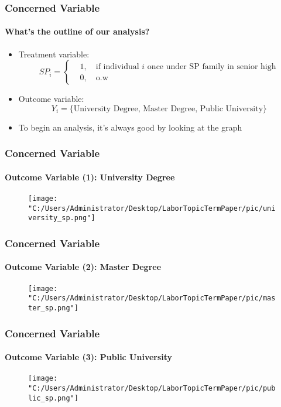 \documentclass{beamer}
\begin{document}
\begin{frame} %
\frametitle{Concerned Variable}
\framesubtitle{What's the outline of our analysis?}

    \begin{itemize}
        \item Treatment variable:
        \[
            \textit{SP}_i =
            \left\{\begin{aligned}
            &1,\quad\text{if individual $i$ once under SP family in senior high} \\
            &0,\quad\text{o.w}
            \end{aligned}\right.
        \]
        \item Outcome variable: 
        \[
            Y_i = \{\text{University Degree, Master Degree, Public University}\}  
        \]
        \item To begin an analysis, it's always good by looking at the graph 
    \end{itemize}

\end{frame}


\begin{frame} %
\frametitle{Concerned Variable}
\framesubtitle{Outcome Variable (1): University Degree}

    \begin{figure}
        \centering
        \texttt{[image: "C:/Users/Administrator/Desktop/LaborTopicTermPaper/pic/university\_sp.png"]}
    \end{figure}

\end{frame}


\begin{frame} %
\frametitle{Concerned Variable}
\framesubtitle{Outcome Variable (2): Master Degree}

    \begin{figure}
        \centering
        \texttt{[image: "C:/Users/Administrator/Desktop/LaborTopicTermPaper/pic/master\_sp.png"]}
    \end{figure}

\end{frame}


\begin{frame} %
\frametitle{Concerned Variable}
\framesubtitle{Outcome Variable (3): Public University}

    \begin{figure}
        \centering
        \label{Fig.sub.1}
        \texttt{[image: "C:/Users/Administrator/Desktop/LaborTopicTermPaper/pic/public\_sp.png"]}
    \end{figure}

\end{frame}
\end{document}
